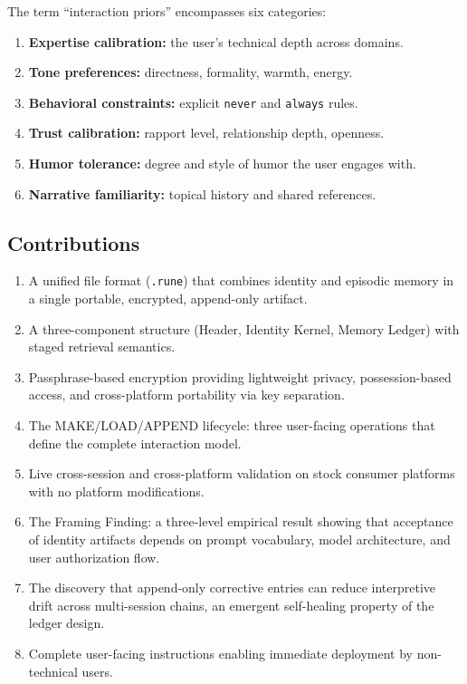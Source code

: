 \documentclass[11pt,a4paper]{article}
\begin{document}
The term ``interaction priors'' encompasses six categories:

\begin{enumerate}
    \item \textbf{Expertise calibration:} the user's technical depth across domains.
    \item \textbf{Tone preferences:} directness, formality, warmth, energy.
    \item \textbf{Behavioral constraints:} explicit \texttt{never} and \texttt{always} rules.
    \item \textbf{Trust calibration:} rapport level, relationship depth, openness.
    \item \textbf{Humor tolerance:} degree and style of humor the user engages with.
    \item \textbf{Narrative familiarity:} topical history and shared references.
\end{enumerate}

\subsection{Contributions}

\begin{enumerate}
    \item A unified file format (\texttt{.rune}) that combines identity and episodic memory in a single portable, encrypted, append-only artifact.
    \item A three-component structure (Header, Identity Kernel, Memory Ledger) with staged retrieval semantics.
    \item Passphrase-based encryption providing lightweight privacy, possession-based access, and cross-platform portability via key separation.
    \item The MAKE/LOAD/APPEND lifecycle: three user-facing operations that define the complete interaction model.
    \item Live cross-session and cross-platform validation on stock consumer platforms with no platform modifications.
    \item The Framing Finding: a three-level empirical result showing that acceptance of identity artifacts depends on prompt vocabulary, model architecture, and user authorization flow.
    \item The discovery that append-only corrective entries can reduce interpretive drift across multi-session chains, an emergent self-healing property of the ledger design.
    \item Complete user-facing instructions enabling immediate deployment by non-technical users.
\end{enumerate}
\end{document}
